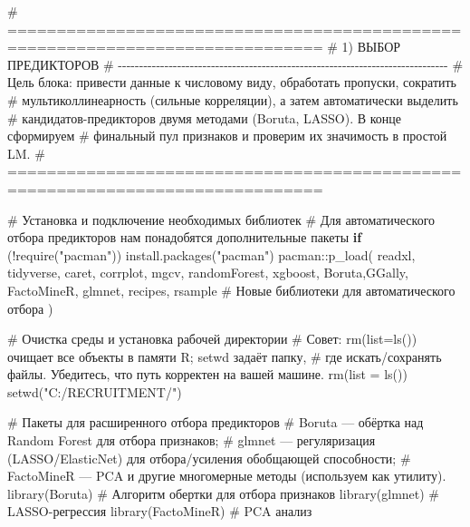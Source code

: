 \documentclass[
  letterpaper,
  DIV=11,
  numbers=noendperiod]{scrreprt}
\newenvironment{Shaded}{\begin{snugshade}}{\end{snugshade}}
\newcommand{\AttributeTok}[1]{\textcolor[rgb]{0.40,0.45,0.13}{#1}}
\newcommand{\CommentTok}[1]{\textcolor[rgb]{0.37,0.37,0.37}{#1}}
\newcommand{\ControlFlowTok}[1]{\textcolor[rgb]{0.00,0.23,0.31}{\textbf{#1}}}
\newcommand{\FunctionTok}[1]{\textcolor[rgb]{0.28,0.35,0.67}{#1}}
\newcommand{\NormalTok}[1]{\textcolor[rgb]{0.00,0.23,0.31}{#1}}
\newcommand{\SpecialCharTok}[1]{\textcolor[rgb]{0.37,0.37,0.37}{#1}}
\newcommand{\StringTok}[1]{\textcolor[rgb]{0.13,0.47,0.30}{#1}}
\begin{document}
\begin{Shaded}
\begin{Highlighting}[]
\CommentTok{\# ==============================================================================}
\CommentTok{\# 1) ВЫБОР ПРЕДИКТОРОВ}
\CommentTok{\# {-}{-}{-}{-}{-}{-}{-}{-}{-}{-}{-}{-}{-}{-}{-}{-}{-}{-}{-}{-}{-}{-}{-}{-}{-}{-}{-}{-}{-}{-}{-}{-}{-}{-}{-}{-}{-}{-}{-}{-}{-}{-}{-}{-}{-}{-}{-}{-}{-}{-}{-}{-}{-}{-}{-}{-}{-}{-}{-}{-}{-}{-}{-}{-}{-}{-}{-}{-}{-}{-}{-}{-}{-}{-}{-}{-}{-}{-}}
\CommentTok{\# Цель блока: привести данные к числовому виду, обработать пропуски, сократить}
\CommentTok{\# мультиколлинеарность (сильные корреляции), а затем автоматически выделить}
\CommentTok{\# кандидатов{-}предикторов двумя методами (Boruta, LASSO). В конце сформируем}
\CommentTok{\# финальный пул признаков и проверим их значимость в простой LM.}
\CommentTok{\# ==============================================================================}

\CommentTok{\# Установка и подключение необходимых библиотек}
\CommentTok{\# Для автоматического отбора предикторов нам понадобятся дополнительные пакеты}
\ControlFlowTok{if}\NormalTok{ (}\SpecialCharTok{!}\FunctionTok{require}\NormalTok{(}\StringTok{"pacman"}\NormalTok{)) }\FunctionTok{install.packages}\NormalTok{(}\StringTok{"pacman"}\NormalTok{)}
\NormalTok{pacman}\SpecialCharTok{::}\FunctionTok{p\_load}\NormalTok{(}
\NormalTok{  readxl, tidyverse, caret, corrplot, mgcv, randomForest, xgboost,}
\NormalTok{  Boruta,GGally, FactoMineR, glmnet, recipes, rsample  }\CommentTok{\# Новые библиотеки для автоматического отбора}
\NormalTok{)}

\CommentTok{\# Очистка среды и установка рабочей директории}
\CommentTok{\# Совет: rm(list=ls()) очищает все объекты в памяти R; setwd задаёт папку,}
\CommentTok{\# где искать/сохранять файлы. Убедитесь, что путь корректен на вашей машине.}
\FunctionTok{rm}\NormalTok{(}\AttributeTok{list =} \FunctionTok{ls}\NormalTok{())}
\FunctionTok{setwd}\NormalTok{(}\StringTok{"C:/RECRUITMENT/"}\NormalTok{)}

\CommentTok{\# Пакеты для расширенного отбора предикторов}
\CommentTok{\# Boruta — обёртка над Random Forest для отбора признаков;}
\CommentTok{\# glmnet — регуляризация (LASSO/ElasticNet) для отбора/усиления обобщающей способности;}
\CommentTok{\# FactoMineR — PCA и другие многомерные методы (используем как утилиту).}
\FunctionTok{library}\NormalTok{(Boruta)   }\CommentTok{\# Алгоритм обертки для отбора признаков}
\FunctionTok{library}\NormalTok{(glmnet)   }\CommentTok{\# LASSO{-}регрессия}
\FunctionTok{library}\NormalTok{(FactoMineR) }\CommentTok{\# PCA анализ}



\end{Highlighting}
\end{Shaded}
\end{document}
